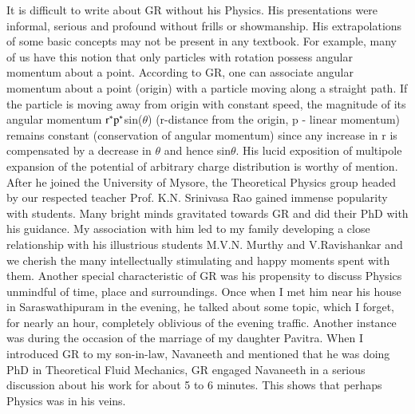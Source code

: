 It is difficult to write about GR without his Physics. His presentations were informal, serious and profound without frills or showmanship. His extrapolations of some basic concepts may not be present in any textbook. For example, many of us have this notion that only particles with rotation possess angular momentum about a point. According to GR, one can associate angular momentum about a point (origin) with a particle moving along a straight path.  If the particle is moving away from origin with constant speed, the magnitude of its angular momentum ${\rm r}^{\ast}{\rm p}^{\ast}$sin($\theta$) (r-distance from the origin, p - linear momentum) remains constant (conservation of angular momentum) since any increase in r is compensated by a decrease in $\theta$ and hence sin$\theta$. His lucid exposition of multipole expansion of the potential of arbitrary charge distribution is worthy of mention. After he joined the University of Mysore, the Theoretical Physics group headed by our respected teacher Prof. K.N. Srinivasa Rao gained immense popularity with students. Many bright minds gravitated towards GR and did their PhD with his guidance. My association with him led to my family developing a close relationship with his illustrious students M.V.N. Murthy and V.Ravishankar and we cherish the many intellectually stimulating and happy moments spent with them. Another special characteristic of GR was his propensity to discuss Physics unmindful of time, place and surroundings. Once when I met him near his house in Saraswathipuram in the evening, he talked about some topic, which I forget, for nearly an hour, completely oblivious of the evening traffic. Another instance was during the occasion of the marriage of my daughter Pavitra. When I introduced GR to my son-in-law, Navaneeth and mentioned that he was doing PhD in Theoretical Fluid Mechanics, GR engaged Navaneeth in a serious discussion about his work for about 5 to 6 minutes. This shows that perhaps Physics was in his veins.

